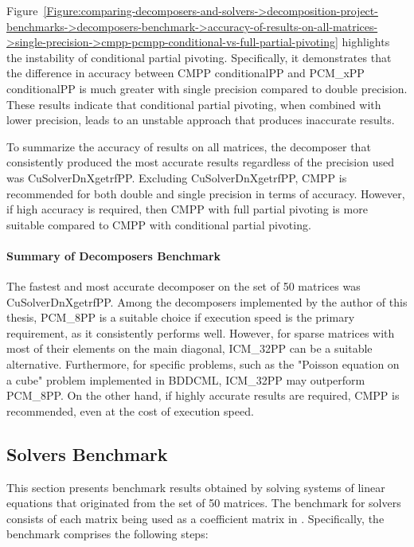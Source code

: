 Figure~\ref{Figure:comparing-decomposers-and-solvers->decomposition-project-benchmarks->decomposers-benchmark->accuracy-of-results-on-all-matrices->single-precision->cmpp-pcmpp-conditional-vs-full-partial-pivoting} highlights the instability of conditional partial pivoting. Specifically, it demonstrates that the difference in accuracy between CMPP conditionalPP and PCM\_xPP conditionalPP is much greater with single precision compared to double precision. These results indicate that conditional partial pivoting, when combined with lower precision, leads to an unstable approach that produces inaccurate results.

To summarize the accuracy of results on all matrices, the decomposer that consistently produced the most accurate results regardless of the precision used was CuSolverDnXgetrfPP. Excluding CuSolverDnXgetrfPP, CMPP is recommended for both double and single precision in terms of accuracy. However, if high accuracy is required, then CMPP with full partial pivoting is more suitable compared to CMPP with conditional partial pivoting.

\paragraph{Summary of Decomposers Benchmark} The fastest and most accurate decomposer on the set of 50 matrices was CuSolverDnXgetrfPP. Among the decomposers implemented by the author of this thesis, PCM\_8PP is a suitable choice if execution speed is the primary requirement, as it consistently performs well. However, for sparse matrices with most of their elements on the main diagonal, ICM\_32PP can be a suitable alternative. Furthermore, for specific problems, such as the "Poisson equation on a cube" problem implemented in BDDCML, ICM\_32PP may outperform PCM\_8PP. On the other hand, if highly accurate results are required, CMPP is recommended, even at the cost of execution speed.



\subsection{Solvers Benchmark}\label{Subsection:comparing-decomposers-and-solvers->decomposition-project-benchmarks->solvers-benchmark}
This section presents benchmark results obtained by solving systems of linear equations that originated from the set of 50 matrices. The benchmark for solvers consists of each matrix being used as a coefficient matrix  in . Specifically, the benchmark comprises the following steps:

